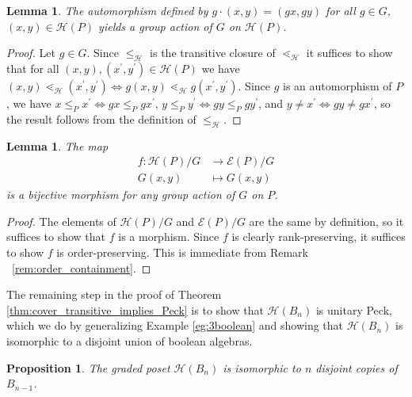 \documentclass[smallextended, envcountsame, numbook]{svjour3}
\theoremstyle{plain}
\newtheorem{prop}[thm]{Proposition}
\newtheorem{lem}[thm]{Lemma}
\theoremstyle{definition}
\theoremstyle{remark}
\numberwithin{equation}{section}
\renewcommand{\iff}{\Leftrightarrow}
\begin{document}
\begin{lem}
\label{lem:G_action_on_HP}
The automorphism defined by $g\cdot (x, y)= (gx, gy)$ for all $g\in G$, $(x, y)\in \mathcal{H}(P)$ yields a group action of $G$ on $\mathcal{H}(P)$.
\end{lem}

\begin{proof}
Let $g\in G$.  Since $\le_{\mathcal{H}}$ is the transitive closure of $\lessdot_{\mathcal{H}}$ it suffices to show that for all $(x,y),(x^\prime,y^\prime)\in \mathcal{H}(P)$ we have $(x, y) \lessdot_{\mathcal H} (x^\prime,y^\prime) \iff g(x, y) \lessdot_{\mathcal H} g(x^\prime, y^\prime)$.  Since $g$ is an automorphism of $P$, we have $x\le_P x^\prime \iff gx\le_P gx^\prime$, $y\le_P y^\prime \iff gy\le_P gy^\prime$, and $y\neq x^\prime \iff gy\neq gx^\prime$, so the result follows from the definition of $\le_{\mathcal{H}}$.
\end{proof}

\begin{lem}
\label{lem:bijection_h_f}
The map 
\begin{align*}
	f\colon\mathcal H(P)/G &\rightarrow \mathcal E(P)/G \\
	G(x,y) &\mapsto G(x,y)
\end{align*}
 is a bijective morphism for any group action of $G$ on $P$.
\end{lem}

\begin{proof}
The elements of $\mathcal H(P)/G$ and $\mathcal E(P)/G$ are the same by definition, so it suffices to show that $f$ is a morphism. Since $f$ is clearly rank-preserving, it suffices to show $f$ is order-preserving. This is immediate from Remark ~\ref{rem:order_containment}.
\end{proof}

The remaining step in the proof of Theorem \ref{thm:cover_transitive_implies_Peck} is to show that $\mathcal{H}(B_n)$ is unitary Peck, which we do by generalizing Example \ref{eg:3boolean} and showing that $\mathcal{H}(B_n)$ is isomorphic to a disjoint union of boolean algebras.

\begin{prop}\label{prop:computing_HBn}
The graded poset $\mathcal{H}(B_n)$ is isomorphic to $n$ disjoint copies of $B_{n-1}$.
\end{prop}
\end{document}
